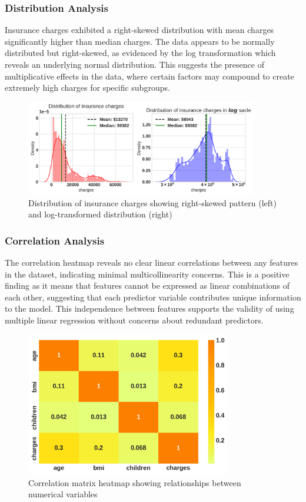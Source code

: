 \documentclass[12pt,a4paper]{article}
\begin{document}
\subsubsection{Distribution Analysis}
Insurance charges exhibited a right-skewed distribution with mean charges significantly higher than median charges. The data appears to be normally distributed but right-skewed, as evidenced by the log transformation which reveals an underlying normal distribution. This suggests the presence of multiplicative effects in the data, where certain factors may compound to create extremely high charges for specific subgroups.

\begin{figure}[H]
\centering
\includegraphics[width=0.9\textwidth]{charges_distribution.png}
\caption{Distribution of insurance charges showing right-skewed pattern (left) and log-transformed distribution (right)}
\label{fig:charges_distribution}
\end{figure}

\subsubsection{Correlation Analysis}
The correlation heatmap reveals no clear linear correlations between any features in the dataset, indicating minimal multicollinearity concerns. This is a positive finding as it means that features cannot be expressed as linear combinations of each other, suggesting that each predictor variable contributes unique information to the model. This independence between features supports the validity of using multiple linear regression without concerns about redundant predictors.

\begin{figure}[H]
\centering
\includegraphics[width=0.8\textwidth]{correlation_heatmap.png}
\caption{Correlation matrix heatmap showing relationships between numerical variables}
\label{fig:correlation_heatmap}
\end{figure}
\end{document}

